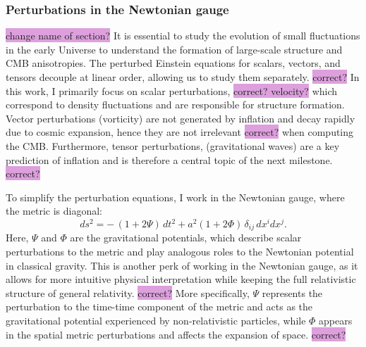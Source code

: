 \documentclass{aa}
\numberwithin{equation}{section}
\numberwithin{table}{section}
\numberwithin{figure}{section}
\begin{document}


\subsubsection{Perturbations in the Newtonian gauge}
\colorbox{Plum}{change name of section?} It is essential to study the evolution of small fluctuations in the early Universe to understand the formation of large-scale structure and CMB anisotropies. The perturbed Einstein equations for scalars, vectors, and tensors decouple at linear order, allowing us to study them separately. \colorbox{Plum}{correct?} In this work, I primarily focus on scalar perturbations, \colorbox{Plum}{correct? velocity?} which correspond to density fluctuations and are responsible for structure formation. Vector perturbations (vorticity) are not generated by inflation and decay rapidly due to cosmic expansion, hence they are not irrelevant \colorbox{Plum}{correct?} when computing the CMB. Furthermore, tensor perturbations, (gravitational waves) are a key prediction of inflation and is therefore a central topic of the next milestone. \colorbox{Plum}{correct?}

To simplify the perturbation equations, I work in the Newtonian gauge, where the metric is diagonal:
\begin{equation}
ds^2 = - \,(1 + 2\Psi)\,dt^2 + a^2 (1 + 2\Phi)\, \delta_{ij}\, dx^i dx^j.
\end{equation}
Here, $\Psi$ and $\Phi$ are the gravitational potentials, which describe scalar perturbations to the metric and play analogous roles to the Newtonian potential in classical gravity. This is another perk of working in the Newtonian gauge, as it allows for more intuitive physical interpretation while keeping the full relativistic structure of general relativity. \colorbox{Plum}{correct?} More specifically, $\Psi$ represents the perturbation to the time-time component of the metric and acts as the gravitational potential experienced by non-relativistic particles, while $\Phi$ appears in the spatial metric perturbations and affects the expansion of space. \colorbox{Plum}{correct?}
\end{document}
